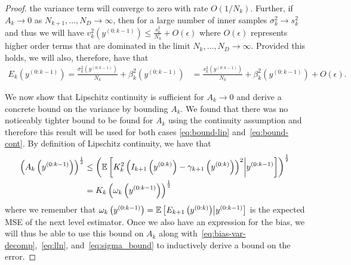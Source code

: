 \begin{proof}
the variance term will converge to zero with rate $O(1/N_k)$.  
Further, if ${A_k}\rightarrow 0$ as $N_{k+1},\dots,N_D \rightarrow \infty$,
then for a large number of inner samples $\sigma_k^2 \rightarrow s_k^2$ and thus we will have
$ v_k^2 \left(y^{(0:k-1)} \right) \le \frac{s_k^2}{N_k} +
O\left(\epsilon\right)$ where $O\left(\epsilon\right)$ represents higher order
terms that are dominated in the limit $N_k,\dots,N_D \rightarrow \infty$.
Provided this holds, we will also, therefore, have that
\begin{align}
\label{eq:E_decomp}
E_k \left(y^{(0:k-1)}\right) 
=\frac{\sigma_k^2 \left(y^{(0:k-1)}\right)}{N_k}+ \beta_k^2 \left(y^{(0:k-1)} \right)
&=\frac{s_k^2 \left(y^{(0:k-1)}\right)}{N_k}+ \beta_k^2 \left(y^{(0:k-1)} \right) +O(\epsilon).
\end{align}

We now show that Lipschitz continuity is sufficient for ${A_k}\rightarrow0$ and derive a
concrete bound on the variance by bounding ${A_k}$.  We found that there was no
noticeably tighter bound to be found for $A_k$ using the continuity assumption and
therefore this result will be used for both cases \eqref{eq:bound-lip} 
and~\eqref{eq:bound-cont}.
By definition of Lipschitz continuity,
we have that
\begin{align}
\left(A_k \left(y^{(0:k-1)}\right)\right)^{\frac{1}{2}} &\le
\left(\mathbb{E} \left[K_k^2 \left(I_{k+1}\left(y^{(0:k)}\right)-
 \gamma_{k+1}\left(y^{(0:k)}\right)\right)^2\middle| y^{(0:k-1)}
 \right] \right)^{\frac{1}{2}} \nonumber \\
 &= K_k \left(\omega_k \left(y^{(0:k-1)}\right)\right)^{\frac{1}{2}}
\end{align}
where we remember that $\omega_k \left(y^{(0:k-1)}\right) 
=\mathbb{E} \left[E_{k+1} 
\left(y^{(0:k)}\right) \middle|  y^{(0:k-1)} \right]$ is the expected MSE
of the next level estimator.  Once we also have an expression for the 
bias, we will thus be able to use this bound on $A_k$ along with~\eqref{eq:bias-var-decomp},~\eqref{eq:lln},
and~\eqref{eq:sigma_bound} to inductively derive a bound on the error.


\end{proof}
